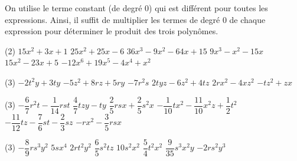 \documentclass[a4paper,12pt]{report}
\begin{document}
\begin{core}
	On utilise le terme constant (de degré 0) qui est différent pour toutes les expressions. Ainsi, il suffit de multiplier les termes de degré 0 de chaque expression pour déterminer le produit des trois polynômes. 
\end{core}

\begin{core}
	\phantom{}
\begin{tasks}(2) \task $15x^2 + 3x + 1 $
\task $ 25x^2 + 25x - 6$
\task $ 36x^3 - 9x^2 - 64x + 15$
\task $ 9x^3 - x^2 - 15x$ 
\task $ 15x^2 - 23x + 5 $
\task $ - 12x^6 + 19x^5 - 4x^4+x^2$ \end{tasks}
\end{core}


\begin{core}\phantom{ }

\begin{tasks}(3)
\task $-2 t^2 y+3ty$
\task $-5 z^2 + 8 r z + 5 r y$
\task $-7r^2s$
\task $2tyz-6 z^2 + 4tz$
\task $2r x^2-4 x z^2$
\task $-tz^2+zx$
\end{tasks}

\end{core}

\begin{core}\phantom{ }

\begin{tasks}(3)
\task $-\dfrac{6}{7} r^2 t-\dfrac{1}{14} r st $
\task $\dfrac{4}{7} t z y-ty$
\task $\dfrac{2}{5} rsx + \dfrac{2}{5} s^2x$
\task $-\dfrac{1}{10} tx^2 -\dfrac{11}{10} x^2 z+ \dfrac{1}{2} t^2$
\task $-\dfrac{11}{12} tz-\dfrac{7}{6} st-\dfrac{2}{3} sz$
\task $-rx^2 -\dfrac{3}{5} rs x$
\end{tasks}

\end{core}


\begin{core}\phantom{ }

\begin{tasks}(3)
\task $-\dfrac{8}{9} rs^3 y^2$
\task $5sx^4$
\task $2 rt^2 y^2$
\task $\dfrac{6}{5} s^2t z$
\task $10 s^2 x^2$
\task $\dfrac{5}{4} t^2 x^2$
\task $\dfrac{9}{35} s^3 x^2y$
\task $-2 r s^2y^3$
\end{tasks}

\end{core}
\end{document}
